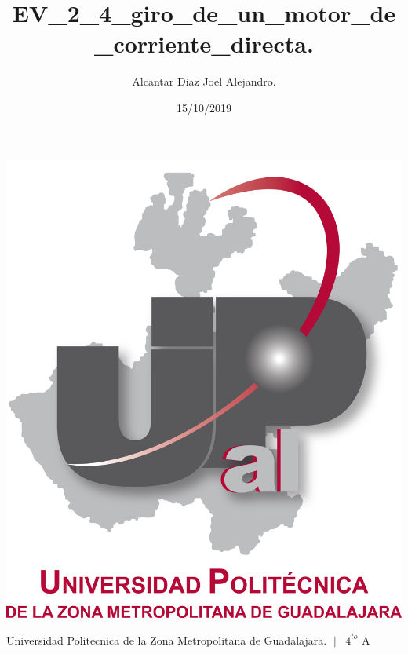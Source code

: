 \documentclass[letterpaper]{article}
\title{EV\_2\_4\_giro\_de\_un\_motor\_de\_corriente\_directa.}
\author{Alcantar Diaz Joel Alejandro.}
\date{15/10/2019}
\begin{document}
\maketitle
\vspace{2cm}
\begin{center}
    \includegraphics[scale=0.5]{IMG/UPZMG.png}\\
    \vspace{2cm}
    \begin{large}
        Universidad Politecnica de la Zona Metropolitana de Guadalajara. $\|$ $4^{to}$ A
    \end{large}
\end{center}
\vspace{2cm}\newpage
\end{document}
